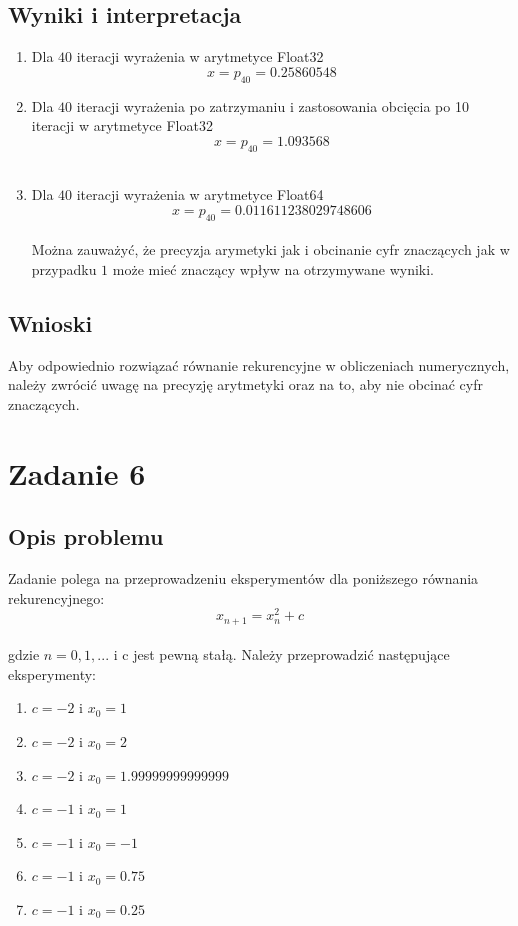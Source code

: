 \documentclass{article}
\begin{document}
\subsection{Wyniki i interpretacja}
\begin{enumerate}
    \item Dla $40$ iteracji wyrażenia w arytmetyce Float32
    $$ x = p_{40} = 0.25860548$$

    \item Dla $40$ iteracji wyrażenia po zatrzymaniu i zastosowania obcięcia po 10 iteracji w arytmetyce Float32
    $$ x = p_{40} = 1.093568$$ \\

    \item Dla $40$ iteracji wyrażenia w arytmetyce Float64
    $$ x = p_{40} = 0.011611238029748606$$ \\
    Można zauważyć, że precyzja arymetyki jak i obcinanie cyfr znaczących jak w przypadku $1$ może mieć znaczący wpływ na otrzymywane wyniki.
\end{enumerate}
\subsection{Wnioski}
Aby odpowiednio rozwiązać równanie rekurencyjne w obliczeniach numerycznych, należy zwrócić uwagę na precyzję arytmetyki oraz na to, aby nie obcinać cyfr znaczących.

\section{Zadanie 6}
\subsection{Opis problemu}
Zadanie polega na przeprowadzeniu eksperymentów dla poniższego równania rekurencyjnego:
$$ x_{n+1} = x^{2}_n + c $$ \\
gdzie $n = 0,1,...$ i c jest pewną stałą. Należy przeprowadzić następujące eksperymenty:
\begin{enumerate}
    \item $c =-2$ i $x_0 = 1$
    \item $c =-2$ i $x_0 = 2$
    \item $c =-2$ i $x_0 = 1.99999999999999$
    \item $c =-1$ i $x_0 = 1$
    \item $c =-1$ i $x_0 = -1$
    \item $c =-1$ i $x_0 = 0.75$
    \item $c =-1$ i $x_0 = 0.25$
\end{enumerate}
\end{document}
